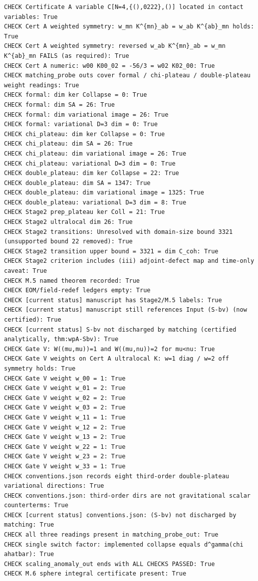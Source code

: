 \documentclass{article}
\theoremstyle{remark}
\begin{document}
\begin{lstlisting}
CHECK Certificate A variable C[N=4,{(),0222},()] located in contact variables: True
CHECK Cert A weighted symmetry: w_mn K^{mn}_ab = w_ab K^{ab}_mn holds: True
CHECK Cert A weighted symmetry: reversed w_ab K^{mn}_ab = w_mn K^{ab}_mn FAILS (as required): True
CHECK Cert A numeric: w00 K00_02 = -56/3 = w02 K02_00: True
CHECK matching_probe outs cover formal / chi-plateau / double-plateau weight readings: True
CHECK formal: dim ker Collapse = 0: True
CHECK formal: dim SA = 26: True
CHECK formal: dim variational image = 26: True
CHECK formal: variational D=3 dim = 0: True
CHECK chi_plateau: dim ker Collapse = 0: True
CHECK chi_plateau: dim SA = 26: True
CHECK chi_plateau: dim variational image = 26: True
CHECK chi_plateau: variational D=3 dim = 0: True
CHECK double_plateau: dim ker Collapse = 22: True
CHECK double_plateau: dim SA = 1347: True
CHECK double_plateau: dim variational image = 1325: True
CHECK double_plateau: variational D=3 dim = 8: True
CHECK Stage2 prep_plateau ker Coll = 21: True
CHECK Stage2 ultralocal dim 26: True
CHECK Stage2 transitions: Unresolved with domain-size bound 3321 (unsupported bound 22 removed): True
CHECK Stage2 transition upper bound = 3321 = dim C_coh: True
CHECK Stage2 criterion includes (iii) adjoint-defect map and time-only caveat: True
CHECK M.5 named theorem recorded: True
CHECK EOM/field-redef ledgers empty: True
CHECK [current status] manuscript has Stage2/M.5 labels: True
CHECK [current status] manuscript still references Input (S-bv) (now certified): True
CHECK [current status] S-bv not discharged by matching (certified analytically, thm:wpA-Sbv): True
CHECK Gate V: W((mu,mu))=1 and W((mu,nu))=2 for mu<nu: True
CHECK Gate V weights on Cert A ultralocal K: w=1 diag / w=2 off symmetry holds: True
CHECK Gate V weight w_00 = 1: True
CHECK Gate V weight w_01 = 2: True
CHECK Gate V weight w_02 = 2: True
CHECK Gate V weight w_03 = 2: True
CHECK Gate V weight w_11 = 1: True
CHECK Gate V weight w_12 = 2: True
CHECK Gate V weight w_13 = 2: True
CHECK Gate V weight w_22 = 1: True
CHECK Gate V weight w_23 = 2: True
CHECK Gate V weight w_33 = 1: True
CHECK conventions.json records eight third-order double-plateau variational directions: True
CHECK conventions.json: third-order dirs are not gravitational scalar counterterms: True
CHECK [current status] conventions.json: (S-bv) not discharged by matching: True
CHECK all three readings present in matching_probe_out: True
CHECK single switch factor: implemented collapse equals d^gamma(chi ahatbar): True
CHECK scaling_anomaly_out ends with ALL CHECKS PASSED: True
CHECK M.6 sphere integral certificate present: True

\end{lstlisting}
\end{document}
